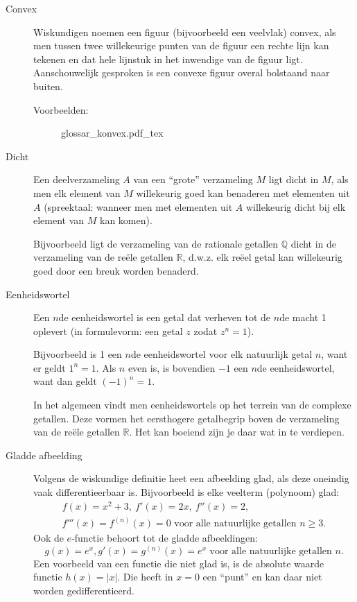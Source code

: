 \begin{description}

	\item[Convex] Wiskundigen noemen een figuur (bijvoorbeeld een veelvlak) convex, als men tussen twee willekeurige punten van de figuur een rechte lijn kan tekenen en dat hele lijnstuk in het inwendige van de figuur ligt. Aanschouwelijk gesproken is een convexe fi\-guur overal bolstaand naar buiten.

		Voorbeelden:
		\begin{figure}
			\def\svgwidth{270pt}
			{glossar_konvex.pdf_tex}
		\end{figure}

	\item[Dicht] Een deelverzameling $A$ van een \enquote{grote} verzameling $M$ ligt dicht in $M$, als men elk element van $M$ willekeurig goed kan benaderen met elementen uit $A$ (spreektaal: wanneer men met elementen uit $A$ willekeurig dicht bij elk element van $M$ kan komen).

	Bijvoorbeeld ligt de verzameling van de rationale getallen $\mathbb{Q}$ dicht in de verzameling van de reële getallen $\mathbb{R}$, d.w.z. elk reëel getal kan willekeurig goed door een breuk worden benaderd.

	\item[Eenheidswortel] Een $n$de eenheidswortel is een getal dat verheven tot de $n$de macht 1 oplevert (in formulevorm: een getal $z$ zodat $z^n = 1$).

	Bijvoorbeeld is 1 een $n$de eenheidswortel voor elk natuurlijk getal $n$, want er geldt $1^n = 1$. Als $n$ even is, is bovendien $-1$ een $n$de eenheidswortel, want dan geldt $(-1)^n = 1$.

	In het algemeen vindt men eenheidswortels op het terrein van de complexe getallen. Deze vormen het eersthogere getalbegrip boven de verzameling van de reële getallen $\mathbb{R}$. Het kan boeiend zijn je daar wat in te verdiepen.

\clearpage

	\item[Gladde afbeelding] Volgens de wiskundige definitie heet een afbeeld\-ing glad, als deze oneindig vaak differentieerbaar is. Bijvoorbeeld is elke veelterm (polynoom) glad:
		\begin{gather*}
			f(x) = x^2 + 3,\ f'(x) = 2x,\ f''(x) = 2,\\
			f'''(x) = f^{(n)}(x) = 0 \text{ voor alle natuurlijke getallen } n \geq 3.
		\end{gather*}
		Ook de $e$-functie behoort tot de gladde afbeeldingen:
		\begin{equation*}
			g(x) = e^x, g'(x) = g^{(n)}(x) = e^x \text{ voor alle natuurlijke getallen } n.
		\end{equation*}
		Een voorbeeld van een functie die niet glad is, is de absolute waarde functie $h(x) = |x|$. Die heeft in $x=0$ een \enquote{punt} en kan daar niet worden gedifferentieerd.


\end{description}
